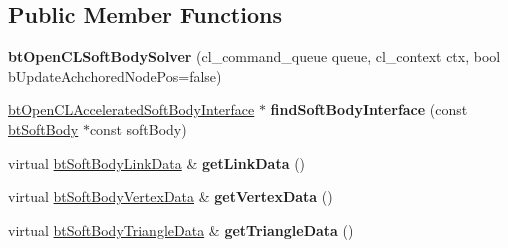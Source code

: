 \subsection*{Public Member Functions}
\begin{DoxyCompactItemize}
\item 
\hypertarget{classbt_open_c_l_soft_body_solver_a2f50ffc4b2264bc9017a97dc091ede38}{{\bfseries bt\+Open\+C\+L\+Soft\+Body\+Solver} (cl\+\_\+command\+\_\+queue queue, cl\+\_\+context ctx, bool b\+Update\+Achchored\+Node\+Pos=false)}\label{classbt_open_c_l_soft_body_solver_a2f50ffc4b2264bc9017a97dc091ede38}

\item 
\hypertarget{classbt_open_c_l_soft_body_solver_a57e630e2c58abfa61baf5263bfd6f8f1}{\hyperlink{classbt_open_c_l_accelerated_soft_body_interface}{bt\+Open\+C\+L\+Accelerated\+Soft\+Body\+Interface} $\ast$ {\bfseries find\+Soft\+Body\+Interface} (const \hyperlink{classbt_soft_body}{bt\+Soft\+Body} $\ast$const soft\+Body)}\label{classbt_open_c_l_soft_body_solver_a57e630e2c58abfa61baf5263bfd6f8f1}

\item 
\hypertarget{classbt_open_c_l_soft_body_solver_ae22858da3af1adfc9fcc856b64ac6c98}{virtual \hyperlink{classbt_soft_body_link_data}{bt\+Soft\+Body\+Link\+Data} \& {\bfseries get\+Link\+Data} ()}\label{classbt_open_c_l_soft_body_solver_ae22858da3af1adfc9fcc856b64ac6c98}

\item 
\hypertarget{classbt_open_c_l_soft_body_solver_a15d45d61a406028903df4a13fed2776c}{virtual \hyperlink{classbt_soft_body_vertex_data}{bt\+Soft\+Body\+Vertex\+Data} \& {\bfseries get\+Vertex\+Data} ()}\label{classbt_open_c_l_soft_body_solver_a15d45d61a406028903df4a13fed2776c}

\item 
\hypertarget{classbt_open_c_l_soft_body_solver_ae257e21c27a3940491407dc9c23729b1}{virtual \hyperlink{classbt_soft_body_triangle_data}{bt\+Soft\+Body\+Triangle\+Data} \& {\bfseries get\+Triangle\+Data} ()}\label{classbt_open_c_l_soft_body_solver_ae257e21c27a3940491407dc9c23729b1}


\end{DoxyCompactItemize}
